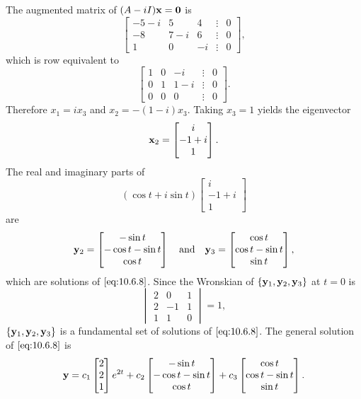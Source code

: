 \documentclass{ximera}
\begin{document}
\begin{example}
\begin{explanation}
The augmented  matrix of $(A-iI){\bf x=0}$ is
$$
\begin{bmatrix}-5-i&5&4&\vdots&0\\-8&
7-i&6&\vdots&0\\ 1&0&-i&\vdots&0
\end{bmatrix},
$$
which is row equivalent to
$$
\begin{bmatrix}1&0&-i&\vdots&0\\ 0&1&1-i&
\vdots&0\\ 0&0&0&\vdots&0\end{bmatrix}.
$$
Therefore $x_1=ix_3$ and $x_2=-(1-i)x_3$. Taking $x_3=1$ yields
the eigenvector
$$
{\bf x}_2=\begin{bmatrix} i\\-1+i\\ 1\end{bmatrix}.
$$
The real and imaginary parts of
$$
(\cos t+i\sin t)\begin{bmatrix}i\\-1+i\\1\end{bmatrix}
$$
 are
$$
{\bf y}_2=
\begin{bmatrix}-\sin t\\-\cos t-\sin t\\\cos t\end{bmatrix}
\quad\mbox{and}\quad
{\bf y}_3=\begin{bmatrix}\cos t\\\cos t-\sin t\\\sin
t\end{bmatrix},
 $$
which are solutions of  $\eqref{eq:10.6.8}$.
Since the  Wronskian of $\{{\bf y}_1,{\bf y}_2,{\bf y}_3\}$
at $t=0$  is
$$
\begin{vmatrix}
2&0&1\\2&-1&1\\1&1&0\end{vmatrix}=1,
$$
 $\{{\bf y}_1,{\bf y}_2,{\bf y}_3\}$ is a
fundamental set of solutions of $\eqref{eq:10.6.8}$. The general solution of
$\eqref{eq:10.6.8}$ is
$$
{\bf y}=c_1 \begin{bmatrix}2\\2\\1\end{bmatrix}e^{2t}
+c_2\begin{bmatrix}-\sin t\\-\cos t-\sin t\\\cos t\end{bmatrix}
+c_3\begin{bmatrix}\cos t\\\cos t-\sin t\\\sin
t\end{bmatrix}.
$$
\end{explanation}
\end{example}
\end{document}
